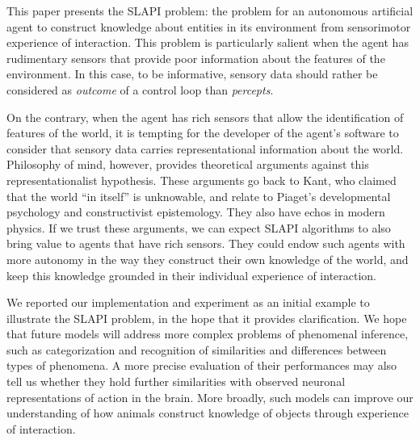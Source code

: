 \documentclass[pmlr]{jmlr}%
\begin{document}
This paper presents the SLAPI problem: the problem for an autonomous artificial agent to construct knowledge about entities in its environment from sensorimotor experience of interaction.  
This problem is particularly salient when the agent has rudimentary sensors that provide poor information about the features of the environment. 
In this case, to be informative, sensory data should rather be considered as \textit{outcome} of a control loop than \textit{percepts}.

On the contrary, when the agent has rich sensors that allow the identification of features of the world, it is tempting for the developer of the agent's software to consider that sensory data carries representational information about the world. 
Philosophy of mind, however, provides theoretical arguments against this representationalist hypothesis. 
These arguments go back to Kant, who claimed that the world ``in itself'' is unknowable, and relate to Piaget's developmental psychology and constructivist epistemology. 
They also have echos in modern physics. 
If we trust these arguments, we can expect SLAPI algorithms to also bring value to agents that have rich sensors. 
They could endow such agents with more autonomy in the way they construct their own knowledge of the world, and keep this knowledge grounded in their individual experience of interaction.

We reported our implementation and experiment as an initial example to illustrate the SLAPI problem, in the hope that it provides clarification. 
We hope that future models will address more complex problems of phenomenal inference, such as categorization and recognition of similarities and differences between types of phenomena. 
A more precise evaluation of their performances may also tell us whether they hold further similarities with observed neuronal representations of action in the brain. 
More broadly, such models can improve our understanding of how animals construct knowledge of objects through experience of interaction. 


\end{document}
